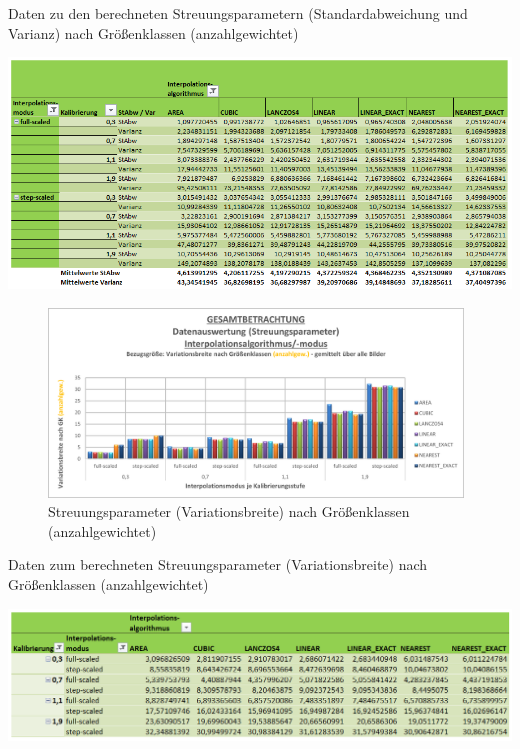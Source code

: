 \documentclass[
fontsize=10pt, 
listof = totoc,
parskip = half	
]{report}
\begin{document}
\begin{table}[H]
	\centering
	\caption{Daten zu den berechneten Streuungsparametern (Standardabweichung und Varianz) nach Größenklassen (anzahlgewichtet)}
	\label{tab:DAGesamtStreu1GKanzahl}
	\includegraphics[width=\textwidth, height=\textheight, keepaspectratio]{pics/Tab_DA_Gesamt_Streu1_GKanzahl}
\end{table} 

\begin{figure}[H]
	\centering
	\includegraphics[width=11cm, height=\textheight, keepaspectratio]{pics/DA_Gesamt_Streu2_GKanzahl}
	\caption{Streuungsparameter (Variationsbreite) nach Größenklassen (anzahlgewichtet)}
	\label{fig:DAGesamtStreu2GKanzahl}
\end{figure}

\begin{table}[H]
	\centering
	\caption{Daten zum berechneten Streuungsparameter (Variationsbreite) nach Größenklassen (anzahlgewichtet)}
	\label{tab:DAGesamtStreu2GKanzahl}
	\includegraphics[width=\textwidth, height=\textheight, keepaspectratio]{pics/Tab_DA_Gesamt_Streu2_GKanzahl}
\end{table}
\end{document}
